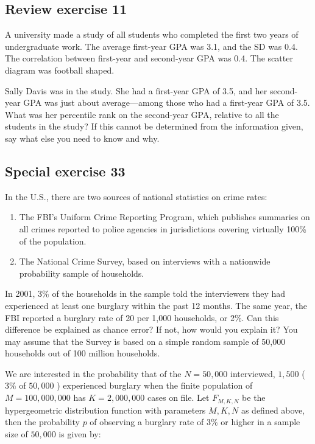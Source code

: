 \documentclass[11pt]{article}
\begin{document}
\subsection*{Review exercise 11} %
A university made a study of all students who completed the first two years of undergraduate work.
The average first-year GPA was 3.1, and the SD was 0.4.
The correlation between first-year and second-year GPA was 0.4.
The scatter diagram was football shaped.

Sally Davis was in the study.
She had a first-year GPA of 3.5, and her second-year GPA was just about average---among those who had a first-year GPA of 3.5.
What was her percentile rank on the second-year GPA, relative to all the students in the study?
If this cannot be determined from the information given, say what else you need to know and why.



\subsection*{Special exercise 33} %
In the U.S., there are two sources of national statistics on crime rates:
\begin{enumerate}[i]
	\item The FBI's Uniform Crime Reporting Program, which publishes summaries on all crimes reported to police agencies in jurisdictions covering virtually 100\% of the population.
	\item The National Crime Survey, based on interviews with a nationwide probability sample of households.
\end{enumerate}

In 2001, 3\% of the households in the sample told the interviewers they had experienced at least one burglary within the past 12 months.
The same year, the FBI reported a burglary rate of 20 per 1,000 households, or 2\%.
Can this difference be explained as chance error?
If not, how would you explain it?
You may assume that the Survey is based on a simple random sample of 50,000 households out of 100 million households.

We are interested in the probability that of the $ N = 50,000 $ interviewed, $ 1,500 $ ($ 3\% $ of $ 50,000 $ ) experienced burglary when the finite population of $ M = 100,000,000 $ has $ K = 2,000,000 $ cases on file.  Let $ F_{M, K, N} $ be the hypergeometric distribution function with parameters $ M,K,N $ as defined above, then the probability $ p $ of observing a burglary rate of 3\% or higher in a sample size of $ 50,000 $ is given by:
\end{document}
